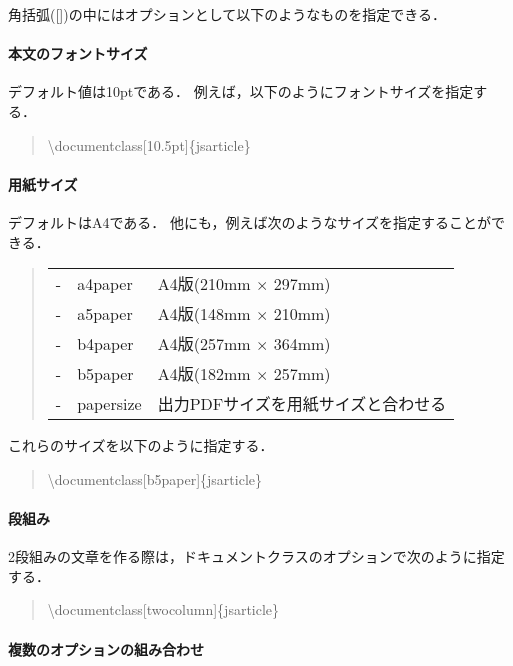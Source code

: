 角括弧([])の中にはオプションとして以下のようなものを指定できる．
\paragraph{本文のフォントサイズ\\}

デフォルト値は10ptである．
例えば，以下のようにフォントサイズを指定する．
\begin{quote}
  \textbackslash documentclass[10.5pt]\{jsarticle\}
\end{quote}

\paragraph{用紙サイズ\\}

デフォルトはA4である．
他にも，例えば次のようなサイズを指定することができる．
\begin{table}[H]
  \begin{quote}
    \begin{tabular}{lll}
       - & a4paper & A4版(210mm $\times$ 297mm) \\
       - & a5paper & A4版(148mm $\times$ 210mm) \\
       - & b4paper & A4版(257mm $\times$ 364mm) \\
       - & b5paper & A4版(182mm $\times$ 257mm) \\
       - & papersize & 出力PDFサイズを用紙サイズと合わせる \\
    \end{tabular}    
  \end{quote}
\end{table}
これらのサイズを以下のように指定する．
\begin{quote}
  \textbackslash documentclass[b5paper]\{jsarticle\}
\end{quote}

\paragraph{段組み\\}

2段組みの文章を作る際は，ドキュメントクラスのオプションで次のように指定する．
\begin{quote}
  \textbackslash documentclass[twocolumn]\{jsarticle\}
\end{quote}

\paragraph{複数のオプションの組み合わせ\\}

